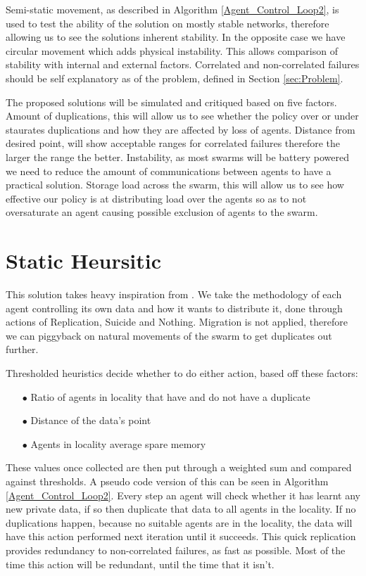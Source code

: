 \documentclass{UoYCSproject}
\begin{document}
Semi-static movement, as described in Algorithm \ref{Agent_Control_Loop2}, is used to test the ability of the solution on mostly stable networks, therefore allowing us to see the solutions inherent stability.
In the opposite case we have circular movement which adds physical instability.
This allows comparison of stability with internal and external factors.
Correlated and non-correlated failures should be self explanatory as of the problem, defined in Section \ref{sec:Problem}.

The proposed solutions will be simulated and critiqued based on five factors.
Amount of duplications, this will allow us to see whether the policy over or under staurates duplications and how they are affected by loss of agents. 
Distance from desired point, will show acceptable ranges for correlated failures therefore the larger the range the better.
Instability, as most swarms will be battery powered we need to reduce the amount of communications between agents to have a practical solution.
Storage load across the swarm, this will allow us to see how effective our policy is at distributing load over the agents so as to not oversaturate an agent causing possible exclusion of agents to the swarm.


\section{Static Heursitic}
\label{sec:Simple2}

This solution takes heavy inspiration from \cite{Distributed Storage}. 
We take the methodology of each agent controlling its own data and how it wants to distribute it, done through actions of Replication, Suicide and Nothing.
Migration is not applied, therefore we can piggyback on natural movements of the swarm to get duplicates out further.

Thresholded heuristics decide whether to do either action, based off these factors:

\begin{itemize}
\itemsep-1em
\item[$\bullet$] Ratio of agents in locality that have and do not have a duplicate
\item[$\bullet$] Distance of the data’s point
\item[$\bullet$] Agents in locality average spare memory
\end{itemize}

These values once collected are then put through a weighted sum and compared against thresholds. 
A pseudo code version of this can be seen in Algorithm \ref{Agent_Control_Loop2}.
Every step an agent will check whether it has learnt any new private data, if so then duplicate that data to all agents in the locality.
If no duplications happen, because no suitable agents are in the locality, the data will have this action performed next iteration until it succeeds.
This quick replication provides redundancy to non-correlated failures, as fast as possible. 
Most of the time this action will be redundant, until the time that it isn’t.
\end{document}
